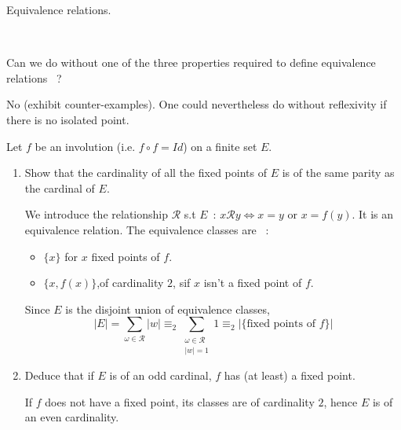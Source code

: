 \documentclass[a4paper,11pt]{exam}
\newcommand{\RR}{\mathbin{\mathcal{R}}}
\begin{document}
 \colorbox{gris}{
\begin{minipage}[c]{15cm}
Equivalence relations.
\end{minipage}
}\\

\begin{questions}
  \question 
  Can we do without one of the three properties required to define equivalence relations ~?

  \begin{solution}
    No (exhibit counter-examples). One could nevertheless do without reflexivity if there is no isolated point.
  \end{solution}

  \question 
  Let $ f $ be an involution (i.e. $f\circ f = Id $) on a finite set $ E $.
  \begin{enumerate}
    \item Show that the cardinality of all the fixed points of $ E $ is of the same parity as the cardinal of $ E $.

      \begin{solution}
        We introduce the relationship $\RR$ s.t $E$~:
        $x \RR y \iff x=y \text{ or } x=f(y)$.
        It is an equivalence relation.
        The equivalence classes are ~:
        \begin{itemize}
          \item $\{x\}$ for $x$ fixed points of $f$.
          \item $\{x,f(x)\}$,of cardinality $2$, sif $x$ isn't a fixed point of $f$.
        \end{itemize}
        Since $ E $ is the disjoint union of equivalence classes, 
        \[
          |E| = \sum_{\omega \in\RR } |w| \equiv_2
          \sum_{\begin{array}{c}\omega \in  \RR \\ |w|=1\end{array}} 1
          \equiv_2 |\{\text{fixed points of } f\}|
        \]
      \end{solution}

    \item Deduce that if $ E $ is of an odd cardinal, $ f $ has (at least) a fixed point.

      \begin{solution}
       If $ f $ does not have a fixed point, its classes are of cardinality $ 2 $, hence $ E $ is of an even cardinality.
      \end{solution}

%
%      	
  \end{enumerate}


\end{questions}
\end{document}
